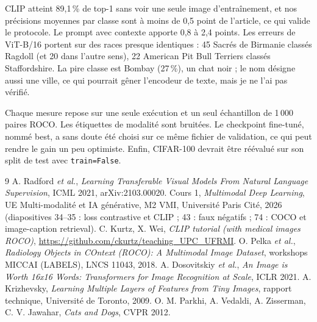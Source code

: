 \documentclass[12pt,a4paper]{article}
\newcommand{\sect}[1]{\vspace{4pt}{\large\bfseries #1}\par\vspace{1pt}}
\begin{document}
CLIP atteint 89,1\,\% de top-1 sans voir une seule image d'entraînement, et nos précisions moyennes par classe sont à moins de 0,5 point de l'article, ce qui valide le protocole. Le prompt avec contexte apporte 0,8 à 2,4 points. Les erreurs de ViT-B/16 portent sur des races presque identiques : 45 Sacrés de Birmanie classés Ragdoll (et 20 dans l'autre sens), 22 American Pit Bull Terriers classés Staffordshire. La pire classe est Bombay (27\,\%), un chat noir ; le nom désigne aussi une ville, ce qui pourrait gêner l'encodeur de texte, mais je ne l'ai pas vérifié.

\sect{6. Limites}
Chaque mesure repose sur une seule exécution et un seul échantillon de 1\,000 paires ROCO. Les étiquettes de modalité sont bruitées. Le checkpoint fine-tuné, nommé \og best\fg, a sans doute été choisi sur ce même fichier de validation, ce qui peut rendre le gain un peu optimiste. Enfin, CIFAR-100 devrait être réévalué sur son split de test avec \texttt{train=False}.

\vspace{3pt}
\renewcommand{\refname}{\normalsize Références}
\begin{thebibliography}{9}\footnotesize\setlength{\itemsep}{0pt}
 A. Radford \textit{et al.}, \textit{Learning Transferable Visual Models From Natural Language Supervision}, ICML 2021, arXiv:2103.00020.
 Cours 1, \textit{Multimodal Deep Learning}, UE Multi-modalité et IA générative, M2 VMI, Université Paris Cité, 2026 (diapositives 34--35 : loss contrastive et CLIP ; 43 : faux négatifs ; 74 : COCO et image-caption retrieval).
 C. Kurtz, X. Wei, \textit{CLIP tutorial (with medical images ROCO)}, \url{https://github.com/ckurtz/teaching_UPC_UFRMI}.
 O. Pelka \textit{et al.}, \textit{Radiology Objects in COntext (ROCO): A Multimodal Image Dataset}, workshops MICCAI (LABELS), LNCS 11043, 2018.
 A. Dosovitskiy \textit{et al.}, \textit{An Image is Worth 16x16 Words: Transformers for Image Recognition at Scale}, ICLR 2021.
 A. Krizhevsky, \textit{Learning Multiple Layers of Features from Tiny Images}, rapport technique, Université de Toronto, 2009.
 O. M. Parkhi, A. Vedaldi, A. Zisserman, C. V. Jawahar, \textit{Cats and Dogs}, CVPR 2012.
\end{thebibliography}
\end{document}
